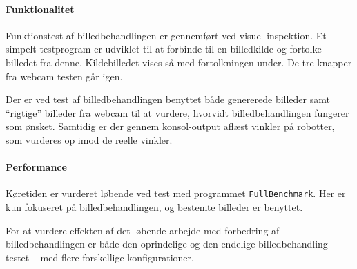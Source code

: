 \paragraph{Funktionalitet}
Funktionstest af billedbehandlingen er gennemført ved visuel inspektion. Et simpelt testprogram er udviklet til at forbinde til en billedkilde og fortolke billedet fra denne. Kildebilledet vises så med fortolkningen under. De tre knapper fra webcam testen går igen.

Der er ved test af billedbehandlingen benyttet både genererede billeder samt "`rigtige"' billeder fra webcam til at vurdere, hvorvidt billedbehandlingen fungerer som ønsket. Samtidig er der gennem konsol-output aflæst vinkler på robotter, som vurderes op imod de reelle vinkler.

\paragraph{Performance}
Køretiden er vurderet løbende ved test med programmet \texttt{FullBenchmark}. Her er kun fokuseret på billedbehandlingen, og bestemte billeder er benyttet.

For at vurdere effekten af det løbende arbejde med forbedring af billedbehandlingen er både den oprindelige og den endelige billedbehandling testet -- med flere forskellige konfigurationer.

